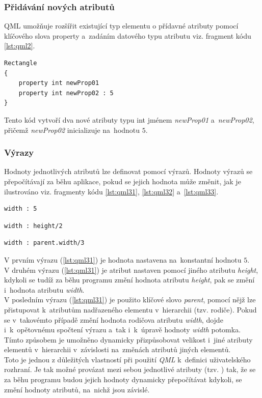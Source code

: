 \documentclass[11pt,twoside,a4paper]{book}
\begin{document}
\subsubsection{Přidávání nových atributů}
QML umožňuje rozšířit existující typ elementu o přídavné atributy pomocí klíčového slova property a~zadáním  datového typu atributu viz. fragment kódu \ref{lst:qml2}.
\begin{lstlisting}[frame=single,caption=Ukázka deklarace dvou nových atributů.,label=lst:qml2]
Rectangle
{
	property int newProp01
	property int newProp02 : 5
}
\end{lstlisting}
Tento kód vytvoří dva nové atributy typu int jménem \textit{newProp01} a~\textit{newProp02}, přičemž \textit{newProp02} inicializuje na~hodnotu $5$.
\subsubsection{Výrazy}
Hodnoty jednotlivých atributů lze definovat pomocí výrazů. Hodnoty výrazů se přepočítávají za běhu aplikace, pokud se jejich hodnota může změnit, jak je ilustrováno viz. fragmenty kódu \ref{lst:qml31}, \ref{lst:qml32} a~\ref{lst:qml33}.
\begin{lstlisting}[frame=single,caption=Výraz ilustrující přiřazení konstanty.,label=lst:qml31]
	width : 5
\end{lstlisting}
\begin{lstlisting}[frame=single,caption=Výraz ilustrující přiřazení hodnoty jiného atributu.,label=lst:qml32]
	width : height/2
\end{lstlisting}
\begin{lstlisting}[frame=single,caption=Výraz ilustrující přiřazení hodnoty atributu jiného elementu.,label=lst:qml33]
	width : parent.width/3
\end{lstlisting}
V prvním výrazu (\ref{lst:qml31}) je hodnota nastavena na~konstantní hodnotu $5$.\\
V druhém výrazu (\ref{lst:qml31}) je atribut nastaven pomocí jiného atributu \textit{height}, kdykoli se tudíž za běhu programu změní hodnota atributu \textit{height}, pak se změní i~hodnota atributu \textit{width}.\\
V posledním výrazu (\ref{lst:qml31}) je použito klíčové slovo \textit{parent}, pomocí nějž lze přistupovat k~atributům nadřazeného elementu v~hierarchii (tzv. rodiče). Pokud se v~takovémto případě změní hodnota rodičova atributu \textit{width}, dojde i~k~opětovnému spočtení výrazu a~tak i~k~úpravě hodnoty \textit{width} potomka. Tímto způsobem je umožněno dynamicky přizpůsobovat velikost i~jiné atributy elementů v~hierarchii v~závislosti na~změnách atributů jiných elementů.\\
Toto je jednou z důležitých vlastností při použití \textit{QML} k~definici uživatelského rozhraní. Je tak možné provázat mezi sebou jednotlivé atributy (tzv. ) tak, že se za běhu programu budou jejich hodnoty dynamicky přepočítávat kdykoli, se změní hodnoty atributů, na~nichž jsou závislé.
\end{document}
